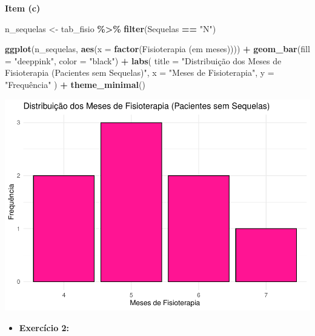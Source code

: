\documentclass[
]{book}
\newenvironment{Shaded}{\begin{snugshade}}{\end{snugshade}}
\newcommand{\AttributeTok}[1]{\textcolor[rgb]{0.13,0.29,0.53}{#1}}
\newcommand{\FunctionTok}[1]{\textcolor[rgb]{0.13,0.29,0.53}{\textbf{#1}}}
\newcommand{\NormalTok}[1]{#1}
\newcommand{\OtherTok}[1]{\textcolor[rgb]{0.56,0.35,0.01}{#1}}
\newcommand{\SpecialCharTok}[1]{\textcolor[rgb]{0.81,0.36,0.00}{\textbf{#1}}}
\newcommand{\StringTok}[1]{\textcolor[rgb]{0.31,0.60,0.02}{#1}}
\providecommand{\tightlist}{%
  \setlength{\itemsep}{0pt}\setlength{\parskip}{0pt}}
\begin{document}
\textbf{Item (c)}

\begin{Shaded}
\begin{Highlighting}[]
\NormalTok{n\_sequelas }\OtherTok{\textless{}{-}}\NormalTok{ tab\_fisio }\SpecialCharTok{\%\textgreater{}\%}
  \FunctionTok{filter}\NormalTok{(Sequelas }\SpecialCharTok{==} \StringTok{"N"}\NormalTok{)}

\FunctionTok{ggplot}\NormalTok{(n\_sequelas, }\FunctionTok{aes}\NormalTok{(}\AttributeTok{x =} \FunctionTok{factor}\NormalTok{(}\StringTok{\textasciigrave{}}\AttributeTok{Fisioterapia (em meses)}\StringTok{\textasciigrave{}}\NormalTok{))) }\SpecialCharTok{+}
  \FunctionTok{geom\_bar}\NormalTok{(}\AttributeTok{fill =} \StringTok{"deeppink"}\NormalTok{, }\AttributeTok{color =} \StringTok{"black"}\NormalTok{) }\SpecialCharTok{+}
  \FunctionTok{labs}\NormalTok{(}
    \AttributeTok{title =} \StringTok{"Distribuição dos Meses de Fisioterapia (Pacientes sem Sequelas)"}\NormalTok{,}
    \AttributeTok{x =} \StringTok{"Meses de Fisioterapia"}\NormalTok{,}
    \AttributeTok{y =} \StringTok{"Frequência"}
\NormalTok{  ) }\SpecialCharTok{+}
  \FunctionTok{theme\_minimal}\NormalTok{()}
\end{Highlighting}
\end{Shaded}

\begin{center}\includegraphics{AED_files/figure-latex/cap6_ex1c-1} \end{center}

\begin{itemize}
\tightlist
\item
  \textbf{Exercício 2:}
\end{itemize}
\end{document}
